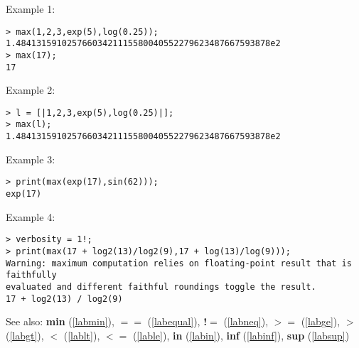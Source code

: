\noindent Example 1: 
\begin{center}\begin{minipage}{15cm}\begin{Verbatim}[frame=single]
> max(1,2,3,exp(5),log(0.25));
1.48413159102576603421115580040552279623487667593878e2
> max(17);
17
\end{Verbatim}
\end{minipage}\end{center}
\noindent Example 2: 
\begin{center}\begin{minipage}{15cm}\begin{Verbatim}[frame=single]
> l = [|1,2,3,exp(5),log(0.25)|];
> max(l);
1.48413159102576603421115580040552279623487667593878e2
\end{Verbatim}
\end{minipage}\end{center}
\noindent Example 3: 
\begin{center}\begin{minipage}{15cm}\begin{Verbatim}[frame=single]
> print(max(exp(17),sin(62)));
exp(17)
\end{Verbatim}
\end{minipage}\end{center}
\noindent Example 4: 
\begin{center}\begin{minipage}{15cm}\begin{Verbatim}[frame=single]
> verbosity = 1!;
> print(max(17 + log2(13)/log2(9),17 + log(13)/log(9)));
Warning: maximum computation relies on floating-point result that is faithfully 
evaluated and different faithful roundings toggle the result.
17 + log2(13) / log2(9)
\end{Verbatim}
\end{minipage}\end{center}
See also: \textbf{min} (\ref{labmin}), \textbf{$==$} (\ref{labequal}), \textbf{!$=$} (\ref{labneq}), \textbf{$>=$} (\ref{labge}), \textbf{$>$} (\ref{labgt}), \textbf{$<$} (\ref{lablt}), \textbf{$<=$} (\ref{lable}), \textbf{in} (\ref{labin}), \textbf{inf} (\ref{labinf}), \textbf{sup} (\ref{labsup})
